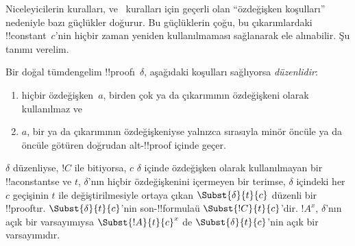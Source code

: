 



Niceleyicilerin kuralları, \Elim{\lexists} ve~\Intro{\lforall} kuralları
için geçerli olan ``özdeğişken koşulları'' nedeniyle bazı güçlükler doğurur.
Bu güçlüklerin çoğu, bu çıkarımlardaki !!{constant}~$c$'nin hiçbir zaman
yeniden kullanılmaması sağlanarak ele alınabilir. Şu tanımı verelim.

\begin{defn}
Bir doğal tümdengelim !!{proof}{}ı~$\delta$, aşağıdaki koşulları sağlıyorsa
\emph{düzenlidir}:
\begin{enumerate}
  \item hiçbir özdeğişken~$a$, birden çok \Elim{\lexists} ya da
  \Intro{\lforall} çıkarımının özdeğişkeni olarak kullanılmaz ve
  \item $a$, bir \Elim{\lexists} ya da \Intro{\lforall} çıkarımının
  özdeğişkeniyse yalnızca sırasıyla minör öncüle ya da öncüle götüren doğrudan
  alt-!!{proof} içinde geçer.
\end{enumerate}
\end{defn}

\begin{lem} $\delta$ düzenliyse, $!C$ ile
bitiyorsa, $c$ $\delta$ içinde özdeğişken olarak kullanılmayan bir
!!a{constant}{}se ve $t$, $\delta$'nın hiçbir özdeğişkenini içermeyen bir
terimse, $\delta$ içindeki her $c$ geçişinin $t$ ile değiştirilmesiyle ortaya
çıkan $\Subst{\delta}{t}{c}$ düzenli bir !!{proof}{}tır.
$\Subst{\delta}{t}{c}$'nin son-!!{formula}{}ü $\Subst{!C}{t}{c}$'dir.
$!A^x$, $\delta$'nın açık bir varsayımıysa $\Subst{!A}{t}{c}^x$ de
$\Subst{\delta}{t}{c}$'nin açık bir varsayımıdır.
\end{lem}

